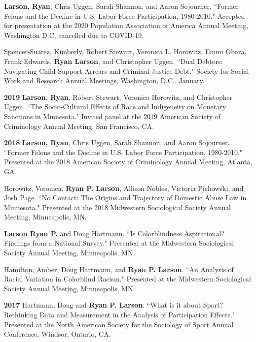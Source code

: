 \documentclass[letterpaper]{article}
\newenvironment{publist}{%
  \begin{list}{}{%
    \setlength{\leftmargin}{0cm}   %
    \setlength{\labelwidth}{2cm}     %
    \setlength{\labelsep}{0.5cm}     %
  }%
}{%
  \end{list}%
}
\begin{document}
\begin{publist}
\item \textbf{Larson, Ryan}, Chris Uggen, Sarah Shannon, and Aaron Sojourner. ``Former Felons and the Decline in U.S. Labor Force Participation, 1980-2010." Accepted for presentation at the 2020 Population Association of America Annual Meeting, Washington D.C, cancelled due to COVID-19. 

\item Spencer-Suarez, Kimberly, Robert Stewart, Veronica L. Horowitz, Emmi Obara, Frank Edwards, \textbf{Ryan Larson}, and Christopher Uggen. ``Dual Debtors: Navigating Child Support Arrears and Criminal Justice Debt." Society for Social Work and Research Annual Meetings, Washington, D.C.. January.

\item[\textbf{2019}] \textbf{Larson, Ryan}, Robert Stewart, Veronica Horowitz, and Christopher Uggen. ``The Socio-Cultural Effects of Race and Indigeneity on Monetary Sanctions in Minnesota." Invited panel at the 2019 American Society of Criminology Annual Meeting, San Francisco, CA.

\item[\textbf{2018}] \textbf{Larson, Ryan}, Chris Uggen, Sarah Shannon, and Aaron Sojourner. ``Former Felons and the Decline in U.S. Labor Force Participation, 1980-2010." Presented at the 2018 American Society of Criminology Annual Meeting, Atlanta, GA. 
\item Horowitz, Veronica, \textbf{Ryan P. Larson}, Allison Nobles, Victoria Piehowski, and Josh Page. ``No Contact: The Origins and Trajectory of Domestic Abuse Law in Minnesota." Presented at the 2018 Midwestern Sociological Society Annual Meeting, Minneapolis, MN. 

\item \textbf{Larson Ryan P.} and Doug Hartmann. ``Is Colorblindness Aspirational? Findings from a National Survey." Presented at the Midwestern Sociological Society Annual Meeting, Minneapolis, MN. 

\item Hamilton, Amber, Doug Hartmann, and \textbf{Ryan P. Larson}. ``An Analysis of Racial Variation in Colorblind Racism." Presented at the Midwestern Sociological Society Annual Meeting, Minneapolis, MN. 

\item[\textbf{2017}] Hartmann, Doug and \textbf{Ryan P. Larson}. ``What is it about Sport? Rethinking Data and Measurement in the Analysis of Participation Effects."  Presented at the North American Society for the Sociology of Sport Annual Conference, Windsor, Ontario, CA. 


\end{publist}
\end{document}
